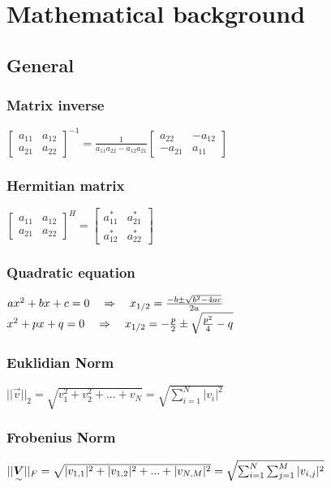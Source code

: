 \section{Mathematical background}
\subsection{General}
\subsubsection{Matrix inverse}
$\begin{bmatrix}a_{11}&a_{12}\\a_{21}&a_{22}\end{bmatrix}^{-1}=
\frac{1}{a_{11}a_{22}-a_{12}a_{21}}\begin{bmatrix}a_{22}&-a_{12}\\-a_{21}&a_{11}\end{bmatrix}$
\subsubsection{Hermitian matrix}
$\begin{bmatrix}a_{11}&a_{12}\\a_{21}&a_{22}\end{bmatrix}^{H}=
\begin{bmatrix}a_{11}^*&a_{21}^*\\a_{12}^*&a_{22}^*\end{bmatrix}$

\subsubsection{Quadratic equation}
$ax^2+bx+c=0\quad\Rightarrow\quad x_{1/2}=\frac{-b\pm\sqrt{b^2-4ac}}{2a}$\\
$x^2 + px + q=0 \quad\Rightarrow\quad x_{1/2}=-\frac{p}{2} \pm \sqrt{\frac{p^2}{4}-q} $\\

\subsubsection{Euklidian Norm}
$||\vec{v}||_2=\sqrt{v_1^2 + v_2^2 + ... + v_N} = \sqrt{\sum_{i=1}^{N}|v_i|^2}$
\subsubsection{Frobenius Norm}
$||\underset{\sim}{\boldsymbol {V}}||_F=\sqrt{|v_{1,1}|^2 + |v_{1,2}|^2+... + |v_{N,M}|^2} =\sqrt{\sum_{i=1}^{N} \sum_{j=1}^{M}|v_{i,j}|^2}$
